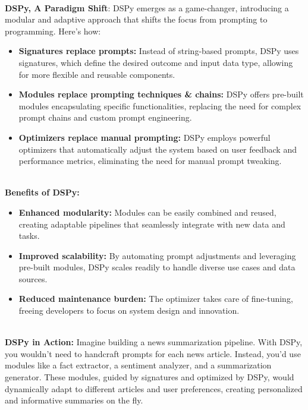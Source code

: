 \\
\textbf{DSPy, A Paradigm Shift}:
DSPy emerges as a game-changer, introducing a modular and adaptive approach that shifts the focus from prompting to programming. Here's how:
\begin{itemize}
    \item \textbf{Signatures replace prompts:} Instead of string-based prompts, DSPy uses signatures, which define the desired outcome and input data type, allowing for more flexible and reusable components.

    \item \textbf{Modules replace prompting techniques & chains:} DSPy offers pre-built modules encapsulating specific functionalities, replacing the need for complex prompt chains and custom prompt engineering.

    \item \textbf{Optimizers replace manual prompting:} DSPy employs powerful optimizers that automatically adjust the system based on user feedback and performance metrics, eliminating the need for manual prompt tweaking.
\end{itemize}
\\
\textbf{Benefits of DSPy:}
\begin{itemize}
    \item \textbf{Enhanced modularity:} Modules can be easily combined and reused, creating adaptable pipelines that seamlessly integrate with new data and tasks.

    \item \textbf{Improved scalability:} By automating prompt adjustments and leveraging pre-built modules, DSPy scales readily to handle diverse use cases and data sources.
    
    \item \textbf{Reduced maintenance burden:} The optimizer takes care of fine-tuning, freeing developers to focus on system design and innovation.
\end{itemize}
\\
\textbf{DSPy in Action:} Imagine building a news summarization pipeline. With DSPy, you wouldn't need to handcraft prompts for each news article. Instead, you'd use modules like a fact extractor, a sentiment analyzer, and a summarization generator. These modules, guided by signatures and optimized by DSPy, would dynamically adapt to different articles and user preferences, creating personalized and informative summaries on the fly.\\
\\
